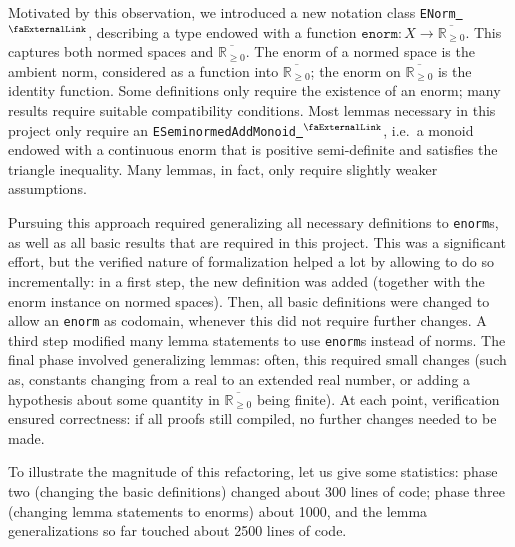 \documentclass[12pt]{amsart}
\newcommand{\lean}[1]{\lstinline{#1}}
\newcommand*{\real}{\mathbb{R}} %
\newcommand{\ennreal}{\overline{\real_{\ge0}}}
\newcommand{\extlink}{~\ensuremath{{}^\text{\faExternalLink}}}
\theoremstyle{definition}
\theoremstyle{plain}
\begin{document}
Motivated by this observation, we introduced a new notation class \lean{ENorm}\href{https://github.com/leanprover-community/mathlib4/blob/44ea3a0e13339f31231dde209c4f8196e179065d/Mathlib/Analysis/Normed/Group/Defs.lean#L70-L74}{\extlink}, describing a type endowed with a function $\texttt{enorm}\colon X\to\ennreal$.
This captures both normed spaces and $\ennreal$. The enorm of a normed space is the ambient norm, considered as a function into $\ennreal$; the enorm on $\ennreal$ is the identity function.
Some definitions only require the existence of an enorm; many results require suitable compatibility conditions. %
Most lemmas necessary in this project only require an \lean{ESeminormedAddMonoid}\href{https://github.com/leanprover-community/mathlib4/blob/44ea3a0e13339f31231dde209c4f8196e179065d/Mathlib/Analysis/Normed/Group/Defs.lean#L111-L117}{\extlink}, i.e.\ a monoid endowed with a continuous enorm that is positive semi-definite and satisfies the triangle inequality. Many lemmas, in fact, only require slightly weaker assumptions. %

Pursuing this approach required generalizing all necessary definitions to \lean{enorm}s, as well as all basic results that are required in this project. This was a significant effort, but the verified nature of formalization helped a lot by allowing to do so incrementally: in a first step, the new definition was added (together with the enorm instance on normed spaces). Then, all basic definitions were changed to allow an \lean{enorm} as codomain, whenever this did not require further changes. A third step modified many lemma statements to use \lean{enorm}s instead of norms.
The final phase involved generalizing lemmas: often, this required small changes (such as, constants changing from a real to an extended real number, or adding a hypothesis about some quantity in $\ennreal$ being finite). At each point, verification ensured correctness: if all proofs still compiled, no further changes needed to be made.

To illustrate the magnitude of this refactoring, let us give some statistics: phase two (changing the basic definitions) changed about 300 lines of code; phase three (changing lemma statements to enorms) about 1000, and the lemma generalizations so far touched about 2500 lines of code.
\end{document}
